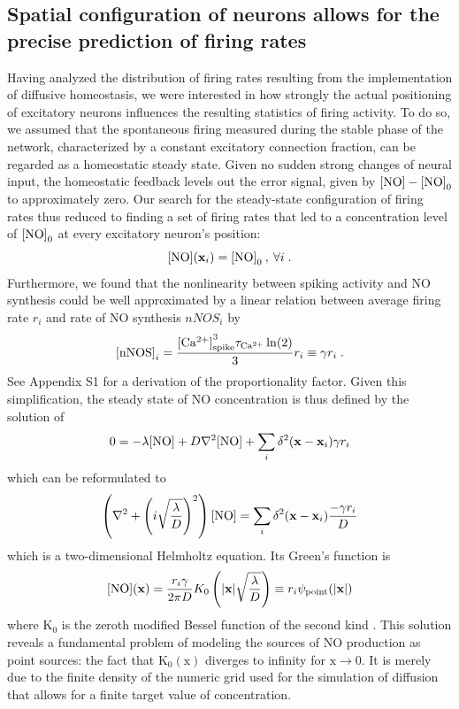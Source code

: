 \documentclass[10pt,letterpaper]{article}
\begin{document}
\subsection*{Spatial configuration of neurons allows for the precise prediction of firing rates}\label{Section_Rand_Mat_vs_Sim}
Having analyzed the distribution of firing rates resulting from the implementation of diffusive homeostasis, we were interested in how strongly the actual positioning of excitatory neurons influences the resulting statistics of firing activity. To do so, we assumed that the spontaneous firing measured during the stable phase of the network, characterized by a constant excitatory connection fraction, can be regarded as a homeostatic steady state. Given no sudden strong changes of neural input, the homeostatic feedback levels out the error signal, given by ${\rm [NO]} - {\rm [NO]}_0$ to approximately zero. Our search for the steady-state configuration of firing rates thus reduced to finding a set of firing rates that led to a concentration level of ${\rm [NO]}_0$ at every excitatory neuron's position:
\begin{equation}
{\rm [NO]}(\mathbf{x}_{i}) = {\rm [NO]}_0 \:, \: \forall i \; .
\label{NO_equil_cond}
\end{equation}
Furthermore, we found that the nonlinearity between spiking activity and NO synthesis could be well approximated by a linear relation between average firing rate $r_i$ and rate of NO synthesis $nNOS_i$ by
\begin{equation}
{\rm [nNOS]}_i = \frac{{\rm [Ca^{2+}]}^3_{\rm spike} \tau_{\rm Ca^{2+}}\ln(2)}{3} r_i \equiv \gamma r_i \; .
\label{simpl_nNOS}
\end{equation}
See Appendix S1 for a derivation of the proportionality factor. Given this simplification, the steady state of NO concentration is thus defined by the solution of
\begin{equation}
0 =-\lambda {\rm [NO]} + D \nabla^2 {\rm [NO]} + \sum_{i} \delta^2(\mathbf{x}-\mathbf{x}_{i}) \gamma r_i \label{simple_NO_dyn_with_diff}
\end{equation}
which can be reformulated to
\begin{equation}
\left(\nabla^2 + \left( i\sqrt{\frac{\lambda}{D}}\right)^2\right) {\rm [NO]} = \sum_{i} \delta^2(\mathbf{x}-\mathbf{x}_{i}) \frac{- \gamma r_i}{D}
\label{simple_NO_dyn_with_diff_equil_helmholtz}
\end{equation}
which is a two-dimensional Helmholtz equation. Its Green's function is
\begin{equation}
{\rm [NO]}(\mathbf{x}) = \frac{r_i \gamma}{2 \pi D} K_0 \left(|\mathbf{x}|\sqrt{\frac{\lambda}{D}} \right) \equiv r_i  \psi_{\rm point}(|\mathbf{x}|)
\label{solution_diff_equil_bessel}
\end{equation}
where $\mathrm{K_0}$ is the zeroth modified Bessel function of the second kind \cite{Helmholtz_Solution_2d}.  This solution reveals a fundamental problem of modeling the sources of NO production as point sources: the fact that $\mathrm{K_0(x)}$ diverges to infinity for $\mathrm{x\rightarrow 0}$. It is merely due to the finite density of the numeric grid used for the simulation of diffusion that allows for a finite target value of concentration.
\end{document}
